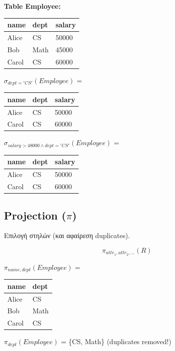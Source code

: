 \begin{examplebox}
\textbf{Table Employee:}
\begin{center}
\begin{tabular}{lll}
\toprule
\textbf{name} & \textbf{dept} & \textbf{salary} \\
\midrule
Alice & CS & 50000 \\
Bob & Math & 45000 \\
Carol & CS & 60000 \\
\bottomrule
\end{tabular}
\end{center}

$\sigma_{dept='CS'}(Employee)$ =

\begin{center}
\begin{tabular}{lll}
\toprule
\textbf{name} & \textbf{dept} & \textbf{salary} \\
\midrule
Alice & CS & 50000 \\
Carol & CS & 60000 \\
\bottomrule
\end{tabular}
\end{center}

$\sigma_{salary > 48000 \land dept='CS'}(Employee)$ =

\begin{center}
\begin{tabular}{lll}
\toprule
\textbf{name} & \textbf{dept} & \textbf{salary} \\
\midrule
Alice & CS & 50000 \\
Carol & CS & 60000 \\
\bottomrule
\end{tabular}
\end{center}
\end{examplebox}

\subsection{Projection (\texorpdfstring{$\pi$}{pi})}

\begin{definitionbox}[Projection]
Επιλογή στηλών (και αφαίρεση duplicates).

\[
\pi_{attr_1, attr_2, ...}(R)
\]
\end{definitionbox}

\begin{examplebox}
$\pi_{name, dept}(Employee)$ =

\begin{center}
\begin{tabular}{ll}
\toprule
\textbf{name} & \textbf{dept} \\
\midrule
Alice & CS \\
Bob & Math \\
Carol & CS \\
\bottomrule
\end{tabular}
\end{center}

$\pi_{dept}(Employee)$ = \{CS, Math\} (duplicates removed!)
\end{examplebox}

